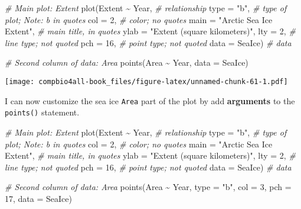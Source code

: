 \documentclass[
]{book}
\newenvironment{Shaded}{\begin{snugshade}}{\end{snugshade}}
\newcommand{\AttributeTok}[1]{\textcolor[rgb]{0.77,0.63,0.00}{#1}}
\newcommand{\CommentTok}[1]{\textcolor[rgb]{0.56,0.35,0.01}{\textit{#1}}}
\newcommand{\DecValTok}[1]{\textcolor[rgb]{0.00,0.00,0.81}{#1}}
\newcommand{\FunctionTok}[1]{\textcolor[rgb]{0.00,0.00,0.00}{#1}}
\newcommand{\NormalTok}[1]{#1}
\newcommand{\SpecialCharTok}[1]{\textcolor[rgb]{0.00,0.00,0.00}{#1}}
\newcommand{\StringTok}[1]{\textcolor[rgb]{0.31,0.60,0.02}{#1}}
\begin{document}
\begin{Shaded}
\begin{Highlighting}[]
\CommentTok{\# Main plot: Extent}
\FunctionTok{plot}\NormalTok{(Extent }\SpecialCharTok{\textasciitilde{}}\NormalTok{ Year,  }\CommentTok{\# relationship}
     \AttributeTok{type =} \StringTok{"b"}\NormalTok{,     }\CommentTok{\# type of plot; Note: b in quotes}
     \AttributeTok{col =} \DecValTok{2}\NormalTok{,        }\CommentTok{\# color; no quotes}
     \AttributeTok{main =} \StringTok{"Arctic Sea Ice Extent"}\NormalTok{, }\CommentTok{\# main title, in quotes}
     \AttributeTok{ylab =} \StringTok{"Extent (square kilometers)"}\NormalTok{,}
     \AttributeTok{lty =} \DecValTok{2}\NormalTok{,        }\CommentTok{\# line type; not quoted}
     \AttributeTok{pch =} \DecValTok{16}\NormalTok{,       }\CommentTok{\# point type; not quoted}
     \AttributeTok{data =}\NormalTok{ SeaIce)  }\CommentTok{\# data}

\CommentTok{\# Second column of data: Area}
\FunctionTok{points}\NormalTok{(Area }\SpecialCharTok{\textasciitilde{}}\NormalTok{ Year, }\AttributeTok{data =}\NormalTok{ SeaIce)}
\end{Highlighting}
\end{Shaded}

\texttt{[image: compbio4all-book\_files/figure-latex/unnamed-chunk-61-1.pdf]}

I can now customize the sea ice \texttt{Area} part of the plot by add \textbf{arguments} to the \texttt{points()} statement.

\begin{Shaded}
\begin{Highlighting}[]
\CommentTok{\# Main plot: Extent}
\FunctionTok{plot}\NormalTok{(Extent }\SpecialCharTok{\textasciitilde{}}\NormalTok{ Year,  }\CommentTok{\# relationship}
     \AttributeTok{type =} \StringTok{"b"}\NormalTok{,     }\CommentTok{\# type of plot; Note: b in quotes}
     \AttributeTok{col =} \DecValTok{2}\NormalTok{,        }\CommentTok{\# color; no quotes}
     \AttributeTok{main =} \StringTok{"Arctic Sea Ice Extent"}\NormalTok{, }\CommentTok{\# main title, in quotes}
     \AttributeTok{ylab =} \StringTok{"Extent (square kilometers)"}\NormalTok{,}
     \AttributeTok{lty =} \DecValTok{2}\NormalTok{,        }\CommentTok{\# line type; not quoted}
     \AttributeTok{pch =} \DecValTok{16}\NormalTok{,       }\CommentTok{\# point type; not quoted}
     \AttributeTok{data =}\NormalTok{ SeaIce)  }\CommentTok{\# data}

\CommentTok{\# Second column of data: Area}
\FunctionTok{points}\NormalTok{(Area }\SpecialCharTok{\textasciitilde{}}\NormalTok{ Year,}
       \AttributeTok{type =} \StringTok{"b"}\NormalTok{,}
       \AttributeTok{col =} \DecValTok{3}\NormalTok{,}
       \AttributeTok{pch =} \DecValTok{17}\NormalTok{,}
       \AttributeTok{data =}\NormalTok{ SeaIce)}
\end{Highlighting}
\end{Shaded}
\end{document}
